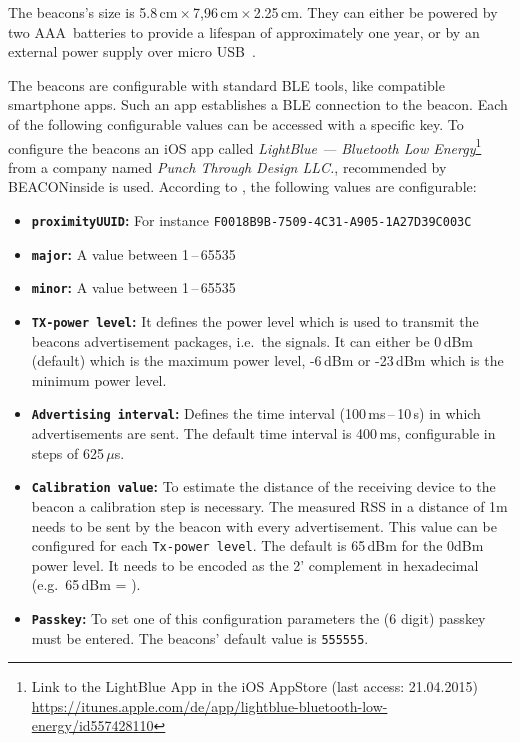 The beacons's size is 5.8\,cm\,$\times$\,7,96\,cm\,$\times$\,2.25\,cm. They can either be powered by two AAA~batteries to provide a lifespan of approximately one year, or by an external power supply over micro USB~\citep{binside:ds}.

The beacons are configurable with standard \ac{BLE} tools, like compatible smartphone apps. Such an app establishes a \ac{BLE} connection to the beacon. Each of the following configurable values can be accessed with a specific key. To configure the beacons an iOS app called \emph{LightBlue --- Bluetooth Low Energy}\footnote{Link to the LightBlue App in the iOS AppStore (last access: 21.04.2015) \url{https://itunes.apple.com/de/app/lightblue-bluetooth-low-energy/id557428110}} from a company named \emph{Punch Through Design LLC.}, recommended by BEACONinside is used. According to \citet{binside:ds}, the following values are configurable:
\begin{itemize}
  \item \textbf{\texttt{proximityUUID}:} For instance \texttt{F0018B9B-7509-4C31-A905-1A27D39C003C}
  \item \textbf{\texttt{major}:} A value between 1\,--\,65535
  \item \textbf{\texttt{minor}:} A value between 1\,--\,65535
  \item \textbf{\texttt{\acs{TX}-power level}:} It defines the power level which is used to transmit the beacons advertisement packages, i.e.\ the signals. It can either be 0\,dBm (default) which is the maximum power level, -6\,dBm or -23\,dBm which is the minimum power level.
  \item \textbf{\texttt{Advertising interval}:} Defines the time interval (100\,ms\,--\,10\,s) in which advertisements are sent. The default time interval is 400\,ms, configurable in steps of 625\,$\mu$s.
  \item \textbf{\texttt{Calibration value}:} To estimate the distance of the receiving device to the beacon a calibration step is necessary. The measured \acs{RSS} in a distance of 1m needs to be sent by the beacon with every advertisement. This value can be configured for each \texttt{Tx-power level}. The default is 65\,dBm for the 0dBm power level. It needs to be encoded as the 2' complement in hexadecimal (e.g.\ 65\,dBm = ).
  \item \textbf{\texttt{Passkey}:} To set one of this configuration parameters the (6 digit) passkey must be entered. The beacons' default value is \texttt{555555}.
\end{itemize}

